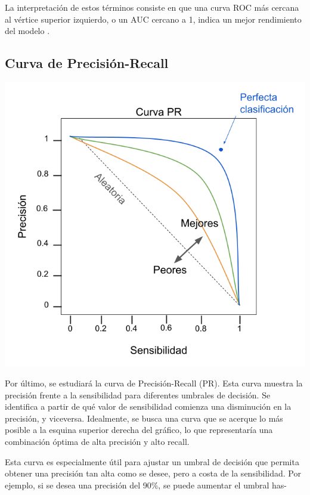 La interpretación de estos términos consiste en que una curva ROC más cercana al vértice superior izquierdo, o un AUC cercano a 1, indica un mejor rendimiento del modelo \citep{geron2022hands}.

\subsection{Curva de Precisión-Recall}

\begin{minipage}{0.4\textwidth}
	\includegraphics[width=1.15\textwidth]{img/pr.png}
	\label{img: pr}
\end{minipage}
\begin{minipage}{0.05\textwidth}
\textbf{ }
\end{minipage}
\begin{minipage}{0.5\textwidth}
Por último, se estudiará la curva de Precisión-Recall (PR). Esta curva muestra la precisión frente a la sensibilidad para diferentes umbrales de decisión. Se identifica a partir de qué valor de sensibilidad comienza una disminución en la precisión, y viceversa. Idealmente, se busca una curva que se acerque lo más posible a la esquina superior derecha del gráfico, lo que representaría una combinación óptima de alta precisión y alto recall.

\bigskip

Esta curva es especialmente útil para ajustar un umbral de decisión que permita obtener una precisión tan alta como se desee, pero a costa de la sensibilidad. Por ejemplo, si se desea una precisión del 90\%, se puede aumentar el umbral has-
\end{minipage}

